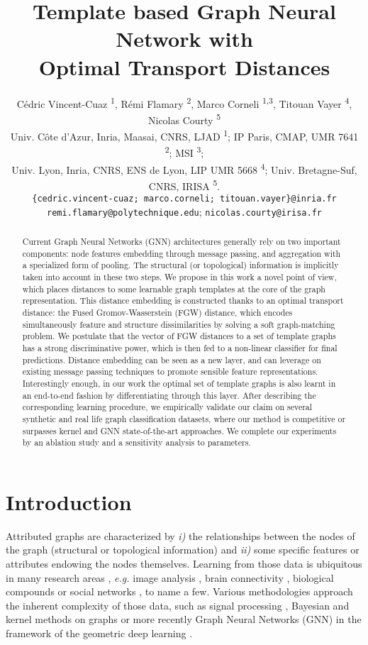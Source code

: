 \documentclass{article}
\title{Template based Graph Neural Network with \\ Optimal Transport Distances}
\author{C\'{e}dric Vincent-Cuaz  \textsuperscript{1}, R\'{e}mi Flamary \textsuperscript{2}, Marco Corneli \textsuperscript{1,3}, Titouan Vayer \textsuperscript{4}, Nicolas Courty \textsuperscript{5}  \\
	Univ. C{\^o}te d{'}Azur, Inria, Maasai, CNRS, LJAD \textsuperscript{1}; IP Paris, CMAP, UMR 7641 \textsuperscript{2}; MSI \textsuperscript{3};\\ Univ. Lyon, Inria, CNRS, ENS de Lyon, LIP UMR 5668 \textsuperscript{4}; Univ. Bretagne-Suf, CNRS, IRISA \textsuperscript{5}. \\
	\texttt{\{cedric.vincent-cuaz; marco.corneli; titouan.vayer\}@inria.fr} \\
	\texttt{remi.flamary@polytechnique.edu};   \texttt{nicolas.courty@irisa.fr}
}
\begin{document}
	
	\maketitle
\begin{abstract}
		Current Graph Neural Networks (GNN) architectures generally rely on two important components: node features embedding through message passing, and aggregation with a specialized form of pooling. The structural (or topological) information is implicitly taken into account in these two steps. We propose in this work a novel point of view, which places distances to some learnable graph templates at the core of the graph representation. This distance embedding is constructed thanks to an optimal transport distance: the Fused Gromov-Wasserstein (FGW) distance, which encodes simultaneously feature and structure dissimilarities by solving a soft graph-matching problem. We postulate that the vector of FGW distances to a set of template graphs has a strong discriminative power, which is then fed to a non-linear classifier for final predictions. Distance embedding can be seen as a new layer, and can leverage on existing message passing techniques to promote sensible feature representations. Interestingly enough, in our work the optimal set of template graphs is also learnt in  an end-to-end fashion by differentiating through this layer. After describing the corresponding learning procedure, we empirically validate our claim on several synthetic and real life graph classification datasets, where our method is competitive or surpasses kernel and GNN state-of-the-art approaches. We complete our experiments by an ablation study and a sensitivity analysis to parameters.
\end{abstract}
	\allowdisplaybreaks
	\section{Introduction}
	



Attributed graphs are characterized by {\em i)} the relationships between the nodes of the graph (structural or topological information) and {\em ii)} some specific features or attributes endowing the nodes themselves. Learning from those data is ubiquitous in many research areas
\citep{battaglia2018relational}, {\em e.g.} image analysis \citep{harchaoui2007image, bronstein2017geometric}, brain connectivity
\cite{ktena-distance-2017}, biological compounds \cite{jumper2021highly} or
social networks \cite{yanardag-deep-2015}, to name a few. Various methodologies approach the inherent complexity of those data, such as signal processing \cite{Shuman2013TheEF}, Bayesian and kernel methods on graphs \cite{NEURIPS2018_1fc21400, kriege2020survey} or more recently Graph Neural Networks (GNN) \cite{wu2020comprehensive} in the framework of the geometric deep learning
\cite{bronstein2017geometric, Bronstein2021GeometricDL}.
\end{document}
